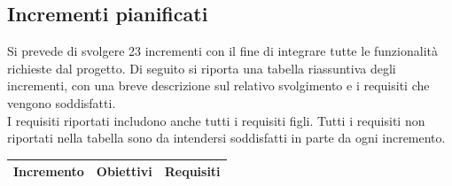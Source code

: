 	\subsection{Incrementi pianificati}
	Si prevede di svolgere 23 incrementi con il fine di integrare tutte le funzionalità richieste dal progetto. Di seguito si riporta una tabella riassuntiva degli incrementi, con una breve descrizione sul relativo svolgimento e i requisiti che vengono soddisfatti. \\
	I requisiti riportati includono anche tutti i requisiti figli. Tutti i requisiti non riportati nella tabella sono da intendersi soddisfatti in parte da ogni incremento. 
	
	\begin{longtable}{
			>{\centering}p{}	%
			>{\centering}p{}	%
			>{\centering}p{}	%
		 }	
		
		\textbf{\color{white}Incremento} &
		\textbf{\color{white}Obiettivi} &
		\textbf{\color{white}Requisiti}
		\tabularnewline
		\endhead
		

\end{longtable}
